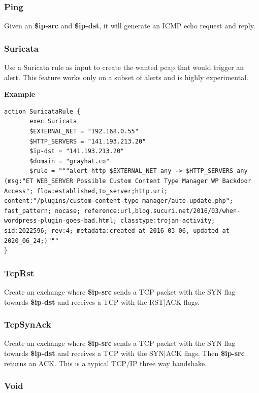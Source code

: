 \documentclass[10pt]{article}
\begin{document}
\subsubsection{Ping}

Given an \textbf{\$ip-src} and \textbf{\$ip-dst}, it will generate an ICMP echo request and reply.

\subsubsection{Suricata}

Use a Suricata rule as input to create the wanted pcap that would trigger an alert. This feature works only on a subset of alerts and is highly experimental.

\textbf{Example}

\begin{lstlisting}[caption={Suricata crafting},captionpos=b]
action SuricataRule {
       exec Suricata
       $EXTERNAL_NET = "192.168.0.55"
       $HTTP_SERVERS = "141.193.213.20"
       $ip-dst = "141.193.213.20"
       $domain = "grayhat.co"
       $rule = """alert http $EXTERNAL_NET any -> $HTTP_SERVERS any (msg:"ET WEB_SERVER Possible Custom Content Type Manager WP Backdoor Access"; flow:established,to_server;http.uri; content:"/plugins/custom-content-type-manager/auto-update.php"; fast_pattern; nocase; reference:url,blog.sucuri.net/2016/03/when-wordpress-plugin-goes-bad.html; classtype:trojan-activity; sid:2022596; rev:4; metadata:created_at 2016_03_06, updated_at 2020_06_24;)"""
}
\end{lstlisting}

\subsubsection{TcpRst}

Create an exchange where \textbf{\$ip-src} sends a TCP packet with the SYN flag towards \textbf{\$ip-dst} and receives a TCP with the RST|ACK flags.

\subsubsection{TcpSynAck}

Create an exchange where \textbf{\$ip-src} sends a TCP packet with the SYN flag towards \textbf{\$ip-dst} and receives a TCP with the SYN|ACK flags. Then \textbf{\$ip-src} returns an ACK. This is a typical TCP/IP three way handshake.

\subsubsection{Void}
\end{document}
